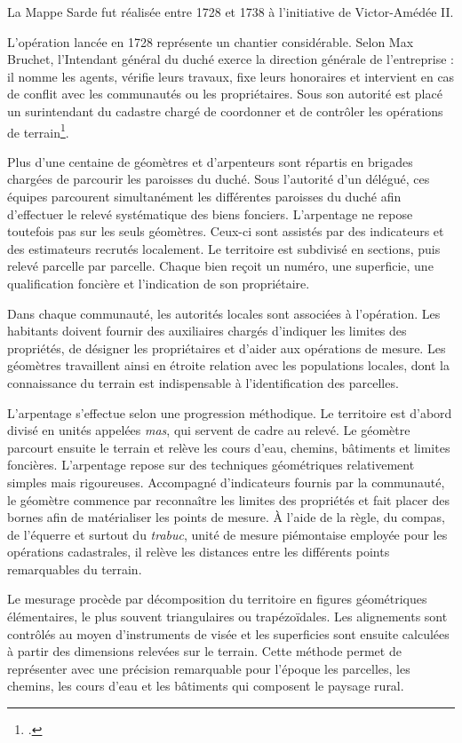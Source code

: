 \documentclass[12pt,a4paper]{report}
\begin{document}
La Mappe Sarde fut réalisée entre 1728 et 1738 à l'initiative de Victor-Amédée II.

L'opération lancée en 1728 représente un chantier considérable. Selon Max Bruchet, l'Intendant général du duché exerce la direction générale de l'entreprise : il nomme les agents, vérifie leurs travaux, fixe leurs honoraires et intervient en cas de conflit avec les communautés ou les propriétaires. Sous son autorité est placé un surintendant du cadastre chargé de coordonner et de contrôler les opérations de terrain\footcite{Bruchet1908Abolition}. 

Plus d'une centaine de géomètres et d'arpenteurs sont répartis en brigades chargées de parcourir les paroisses du duché. Sous l'autorité d'un délégué, ces équipes parcourent simultanément les différentes paroisses du duché afin d'effectuer le relevé systématique des biens fonciers. L'arpentage ne repose toutefois pas sur les seuls géomètres. Ceux-ci sont assistés par des indicateurs et des estimateurs recrutés localement.   
Le territoire est subdivisé en sections, puis relevé parcelle par parcelle. Chaque bien reçoit un numéro, une superficie, une qualification foncière et l'indication de son propriétaire.

Dans chaque communauté, les autorités locales sont associées à l'opération. Les habitants doivent fournir des auxiliaires chargés d'indiquer les limites des propriétés, de désigner les propriétaires et d'aider aux opérations de mesure. Les géomètres travaillent ainsi en étroite relation avec les populations locales, dont la connaissance du terrain est indispensable à l'identification des parcelles.

L'arpentage s'effectue selon une progression méthodique. Le territoire est d'abord divisé en unités appelées \emph{mas}, qui servent de cadre au relevé. Le géomètre parcourt ensuite le terrain et relève les cours d'eau, chemins, bâtiments et limites foncières. 
L'arpentage repose sur des techniques géométriques relativement simples mais rigoureuses. Accompagné d'indicateurs fournis par la communauté, le géomètre commence par reconnaître les limites des propriétés et fait placer des bornes afin de matérialiser les points de mesure. À l'aide de la règle, du compas, de l'équerre et surtout du \emph{trabuc}, unité de mesure piémontaise employée pour les opérations cadastrales, il relève les distances entre les différents points remarquables du terrain.

Le mesurage procède par décomposition du territoire en figures géométriques élémentaires, le plus souvent triangulaires ou trapézoïdales. Les alignements sont contrôlés au moyen d'instruments de visée et les superficies sont ensuite calculées à partir des dimensions relevées sur le terrain. Cette méthode permet de représenter avec une précision remarquable pour l'époque les parcelles, les chemins, les cours d'eau et les bâtiments qui composent le paysage rural.
\end{document}
